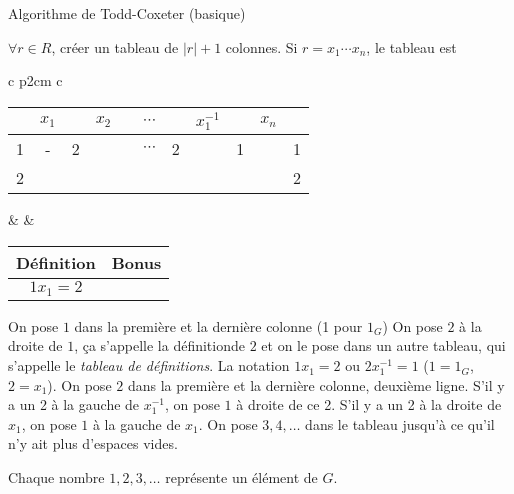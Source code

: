      \begin{algorithm}
       \caption{Algorithme de Todd-Coxeter (basique)}
       \label{alg:todd-coxeter-basique}
       \begin{algorithmic}
         \State $\forall r \in R$, créer un tableau de $|r|+1$ colonnes.
         \State Si $r = x_1 \cdots x_n$, le tableau est
         \State
         \begin{tabular}{c p{2cm} c}
           \begin{tabular}{|ccccccccccc|}
             \hline
             & $x_1$ & & $x_2$ & & $\cdots$ & & $x_1^{-1}$ & & $x_n$ & \\
             \hline
             1 & - & 2 &  & & $\cdots$ & 2 & & 1 & & 1 \\
             2 &  & & & & & & & & & 2\\
             \hline
           \end{tabular}
             & &
                 \begin{tabular}{|c|c|}
                   \hline
                   Définition & Bonus \\
                   \hline
                   $1x_1 = 2$ & \\
                   \hline
                 \end{tabular}
         \end{tabular}
         \State On pose $1$ dans la première et la dernière colonne (1 pour $1_G$)
         \State On pose $2$ à la droite de $1$, ça s'appelle la \og définition\fg de $2$ et on le pose dans un
         autre tableau, qui s'appelle le \emph{tableau de définitions}.  La
         notation $1 x_1 = 2$ ou $2 x_1^{-1} = 1$ ($1 = 1_G$, $2 = x_1$).
         \State On pose $2$ dans la première et la dernière colonne, deuxième ligne.
         \State S'il y a un 2 à la gauche de $x_1^{-1}$, on pose $1$ à droite de ce 2.
         \State S'il y a un 2 à la droite de $x_1$, on pose $1$ à la gauche de $x_1$.
         \State On pose $3, 4, \ldots$ dans le tableau jusqu'à ce qu'il n'y ait plus d'espaces vides.
       \end{algorithmic} 
     \end{algorithm}
     

     \begin{rem} \label{rem:rem-1}
       Chaque nombre $1, 2, 3, \ldots$ représente un élément de $G$.
     \end{rem}
     

